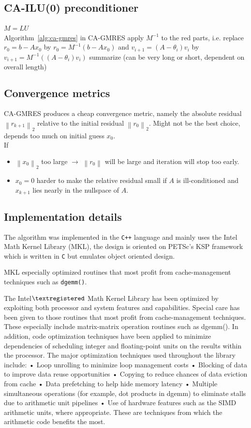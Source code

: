 \documentclass{scrartcl}
\numberwithin{equation}{section}
\newcommand{\norm}[1]{\left\lVert#1\right\rVert}
\begin{document}
\subsection{CA-ILU(0) preconditioner} \label{sec:ca-ilu}
$M = LU$ \\
Algorithm~\ref{alg:ca-gmres} in CA-GMRES apply $M^{-1}$ to the red parts, i.e. replace $r_0 = b - Ax_0$ by $r_0 = M^{-1}(b - Ax_0)$ and  $v_{i + 1} = (A - \theta_i)v_i$ by $v_{i + 1} = M^{-1}((A - \theta_i)v_i)$
summarize \cite{Grigori} (can be very long or short, dependent on overall length)
\subsection{Convergence metrics}
CA-GMRES produces a cheap convergence metric, namely the absolute residual $\norm{r_{k+1}}_2$ relative to the initial residual $\norm{r_0}_2$. Might not be the best choice, depends too much on initial guess $x_0$.\\

If 
\begin{itemize}
\item $\norm{x_0}_2$ too large $\rightarrow$ $\norm{r_0}$ will be large and iteration will stop too early.
\item $x_0 = 0$ harder to make the relative residual small if $A$ is ill-conditioned and $x_{k+1}$ lies nearly in the nullspace of $A$.
\end{itemize}
\subsection{Implementation details}
The algorithm was implemented in the \texttt{C++} language and mainly uses the Intel Math Kernel Library (MKL), the design is oriented on PETSc's KSP framework which is written in \texttt{C} but emulates object oriented design.

MKL especially optimized routines that most profit from cache-management techniques such as \texttt{dgemm()}.

The Intel$\textregistered$ Math Kernel Library has been optimized by exploiting both processor and system features and capabilities. Special care has been given to those routines that most profit from cache-management
techniques. These especially include matrix-matrix operation routines such as dgemm().
In addition, code optimization techniques have been applied to minimize dependencies of scheduling integer and floating-point units on the results within the processor.
The major optimization techniques used throughout the library include:
• Loop unrolling to minimize loop management costs
• Blocking of data to improve data reuse opportunities
• Copying to reduce chances of data eviction from cache
• Data prefetching to help hide memory latency
• Multiple simultaneous operations (for example, dot products in dgemm) to eliminate stalls due to arithmetic unit pipelines
• Use of hardware features such as the SIMD arithmetic units, where appropriate.
These are techniques from which the arithmetic code benefits the most.
\end{document}
